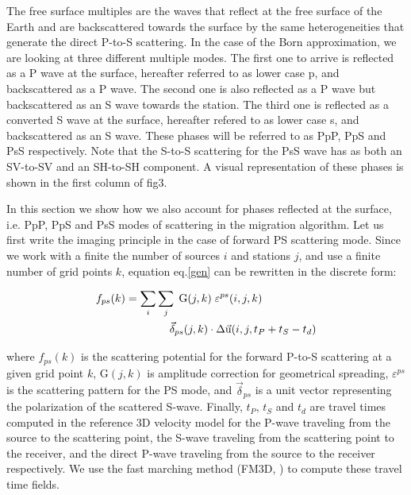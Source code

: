 \documentclass[9pt,a4paper]{article}
\numberwithin{equation}{section}
\begin{document}
\begin{multicols}{2}
The free surface multiples are the waves that reflect at the free surface of the Earth and are backscattered towards the surface by the same heterogeneities that generate the direct P-to-S scattering.
In the case of the Born approximation, we are looking at three different multiple modes.
The first one to arrive is reflected as a P wave at the surface, hereafter referred to as lower case p, and backscattered as a P wave.
The second one is also reflected as a P wave but backscattered as an S wave towards the station.
The third one is reflected as a converted S wave at the surface, hereafter refered to as lower case s, and backscattered as an S wave.
These phases will be referred to as PpP, PpS and PsS respectively.
Note that the S-to-S scattering for the PsS wave has as both an SV-to-SV and an SH-to-SH component.
A visual representation of these phases is shown in the first column of fig3.

In this section we show how we also account for phases reflected at the surface, i.e. PpP, PpS and PsS modes of scattering in the migration algorithm.
Let us first write the imaging principle in the case of forward PS scattering mode.
Since we work with a finite the number of sources $i$ and stations $j$, and use a finite number of grid points $k$, equation eq.\eqref{gen} can be rewritten in the discrete form:

\begin{align}
  f_{ps}(k) &= \sum_i \sum_j \; \text{G}(j,k) \; \varepsilon^{ps}(i,j,k) \; \notag\\&\qquad\qquad \vec{\delta}_{ps}(j,k) \cdot \Delta\vec{\text{u}}(i,j,t_P+t_S-t_d)
 \label{ps}
\end{align}
\vspace{1mm}

\noindent where $f_{ps}(k)$ is the scattering potential for the forward P-to-S scattering at a given grid point $k$,
G$(j,k)$ is amplitude correction for geometrical spreading, 
$\varepsilon^{ps}$ is the scattering pattern for the PS mode, 
and $\vec{\delta}_{ps}$ is a unit vector representing the polarization of the scattered S-wave.
Finally, $t_P$, $t_S$ and $t_d$ are travel times computed in the reference 3D velocity model for the P-wave traveling from the source to the scattering point, the S-wave traveling from the scattering point to the receiver, and the direct P-wave traveling  from the source to the receiver respectively.
We use the fast marching method (FM3D, \cite{deko_gji_06}) to compute these travel time fields.


\end{multicols}
\end{document}

